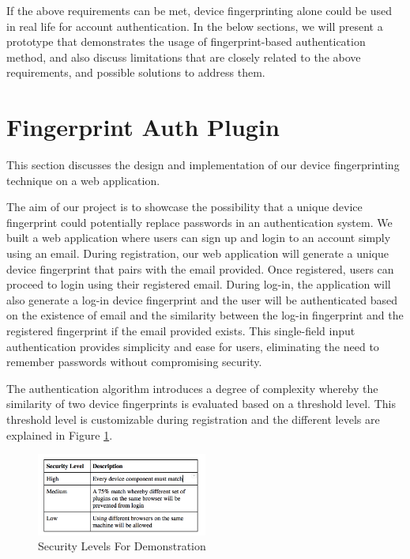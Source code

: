 \documentclass{acm_proc_article-sp}
\begin{document}
If the above requirements can be met, device fingerprinting alone could be used in real life for account authentication. In the below sections, we will present a prototype that demonstrates the usage of fingerprint-based authentication method, and also discuss limitations that are closely related to the above requirements, and possible solutions to address them.


\section{Fingerprint Auth Plugin}
This section discusses the design and implementation of our device fingerprinting technique on a web application.
 
The aim of our project is to showcase the possibility that a unique device fingerprint could potentially replace passwords in an authentication system. We built a web application where users can sign up and login to an account simply using an email. During registration, our web application will generate a unique device fingerprint that pairs with the email provided. Once registered, users can proceed to login using their registered email. During log-in, the application will also generate a log-in device fingerprint and the user will be authenticated based on the existence of email and the similarity between the log-in fingerprint and the registered fingerprint if the email provided exists. This single-field input authentication provides simplicity and ease for users, eliminating the need to remember passwords without compromising security.

The authentication algorithm introduces a degree of complexity whereby the similarity of two device fingerprints is evaluated based on a threshold level. This threshold level is customizable during registration and the different levels are explained in Figure \ref{fig:level}.

\begin{figure}[h]
    \centering
    \includegraphics[width=0.5\textwidth]{assets/level.png}
    \caption{Security Levels For Demonstration}
    \label{fig:level}
\end{figure}
\end{document}
